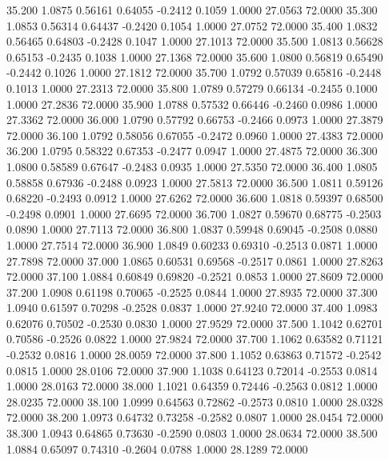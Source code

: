   35.200   1.0875   0.56161   0.64055  -0.2412   0.1059   1.0000  27.0563  72.0000
  35.300   1.0853   0.56314   0.64437  -0.2420   0.1054   1.0000  27.0752  72.0000
  35.400   1.0832   0.56465   0.64803  -0.2428   0.1047   1.0000  27.1013  72.0000
  35.500   1.0813   0.56628   0.65153  -0.2435   0.1038   1.0000  27.1368  72.0000
  35.600   1.0800   0.56819   0.65490  -0.2442   0.1026   1.0000  27.1812  72.0000
  35.700   1.0792   0.57039   0.65816  -0.2448   0.1013   1.0000  27.2313  72.0000
  35.800   1.0789   0.57279   0.66134  -0.2455   0.1000   1.0000  27.2836  72.0000
  35.900   1.0788   0.57532   0.66446  -0.2460   0.0986   1.0000  27.3362  72.0000
  36.000   1.0790   0.57792   0.66753  -0.2466   0.0973   1.0000  27.3879  72.0000
  36.100   1.0792   0.58056   0.67055  -0.2472   0.0960   1.0000  27.4383  72.0000
  36.200   1.0795   0.58322   0.67353  -0.2477   0.0947   1.0000  27.4875  72.0000
  36.300   1.0800   0.58589   0.67647  -0.2483   0.0935   1.0000  27.5350  72.0000
  36.400   1.0805   0.58858   0.67936  -0.2488   0.0923   1.0000  27.5813  72.0000
  36.500   1.0811   0.59126   0.68220  -0.2493   0.0912   1.0000  27.6262  72.0000
  36.600   1.0818   0.59397   0.68500  -0.2498   0.0901   1.0000  27.6695  72.0000
  36.700   1.0827   0.59670   0.68775  -0.2503   0.0890   1.0000  27.7113  72.0000
  36.800   1.0837   0.59948   0.69045  -0.2508   0.0880   1.0000  27.7514  72.0000
  36.900   1.0849   0.60233   0.69310  -0.2513   0.0871   1.0000  27.7898  72.0000
  37.000   1.0865   0.60531   0.69568  -0.2517   0.0861   1.0000  27.8263  72.0000
  37.100   1.0884   0.60849   0.69820  -0.2521   0.0853   1.0000  27.8609  72.0000
  37.200   1.0908   0.61198   0.70065  -0.2525   0.0844   1.0000  27.8935  72.0000
  37.300   1.0940   0.61597   0.70298  -0.2528   0.0837   1.0000  27.9240  72.0000
  37.400   1.0983   0.62076   0.70502  -0.2530   0.0830   1.0000  27.9529  72.0000
  37.500   1.1042   0.62701   0.70586  -0.2526   0.0822   1.0000  27.9824  72.0000
  37.700   1.1062   0.63582   0.71121  -0.2532   0.0816   1.0000  28.0059  72.0000
  37.800   1.1052   0.63863   0.71572  -0.2542   0.0815   1.0000  28.0106  72.0000
  37.900   1.1038   0.64123   0.72014  -0.2553   0.0814   1.0000  28.0163  72.0000
  38.000   1.1021   0.64359   0.72446  -0.2563   0.0812   1.0000  28.0235  72.0000
  38.100   1.0999   0.64563   0.72862  -0.2573   0.0810   1.0000  28.0328  72.0000
  38.200   1.0973   0.64732   0.73258  -0.2582   0.0807   1.0000  28.0454  72.0000
  38.300   1.0943   0.64865   0.73630  -0.2590   0.0803   1.0000  28.0634  72.0000
  38.500   1.0884   0.65097   0.74310  -0.2604   0.0788   1.0000  28.1289  72.0000
